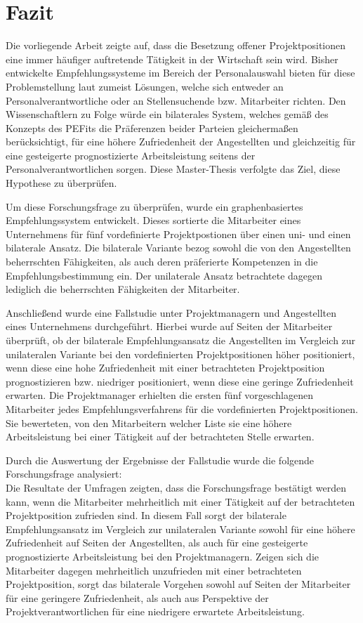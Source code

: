 \chapter{Fazit}
\label{ch:fazit}
Die vorliegende Arbeit zeigte auf, dass die Besetzung offener Projektpositionen eine immer häufiger auftretende Tätigkeit in der Wirtschaft sein wird. Bisher entwickelte Empfehlungssysteme im Bereich der Personalauswahl bieten für diese Problemstellung laut \textcite[S. 1ff.]{malinowski:2006} zumeist Lösungen, welche sich entweder an Personalverantwortliche oder an Stellensuchende bzw. Mitarbeiter richten. Den Wissenschaftlern zu Folge würde ein bilaterales System, welches gemäß des Konzepts des \acfp{PEFit} die Präferenzen beider Parteien gleichermaßen berücksichtigt, für eine höhere Zufriedenheit der Angestellten und gleichzeitig für eine gesteigerte prognostizierte Arbeitsleistung seitens der Personalverantwortlichen sorgen. Diese Master-Thesis verfolgte das Ziel, diese Hypothese zu überprüfen.

Um diese Forschungsfrage zu überprüfen, wurde ein graphenbasiertes Empfehlungssystem entwickelt. Dieses sortierte die Mitarbeiter eines Unternehmens für fünf vordefinierte Projektpostionen über einen uni- und einen bilaterale Ansatz. Die bilaterale Variante bezog sowohl die von den Angestellten beherrschten Fähigkeiten, als auch deren präferierte Kompetenzen in die Empfehlungsbestimmung ein. Der unilaterale Ansatz betrachtete dagegen lediglich die beherrschten Fähigkeiten der Mitarbeiter.

Anschließend wurde eine Fallstudie unter Projektmanagern und Angestellten eines Unternehmens durchgeführt. Hierbei wurde auf Seiten der Mitarbeiter überprüft, ob der bilaterale Empfehlungsansatz die Angestellten im Vergleich zur unilateralen Variante bei den vordefinierten Projektpositionen höher positioniert, wenn diese eine hohe Zufriedenheit mit einer betrachteten Projektposition prognostizieren bzw. niedriger positioniert, wenn diese eine geringe Zufriedenheit erwarten. Die Projektmanager erhielten die ersten fünf vorgeschlagenen Mitarbeiter jedes Empfehlungsverfahrens für die vordefinierten Projektpositionen. Sie bewerteten, von den Mitarbeitern welcher Liste sie eine höhere Arbeitsleistung bei einer Tätigkeit auf der betrachteten Stelle erwarten.

Durch die Auswertung der Ergebnisse der Fallstudie wurde die folgende Forschungsfrage analysiert: \forschungsfrage\\
Die Resultate der Umfragen zeigten, dass die Forschungsfrage bestätigt werden kann, wenn die Mitarbeiter mehrheitlich mit einer Tätigkeit auf der betrachteten Projektposition zufrieden sind. In diesem Fall sorgt der bilaterale Empfehlungsansatz im Vergleich zur unilateralen Variante sowohl für eine höhere Zufriedenheit auf Seiten der Angestellten, als auch für eine gesteigerte prognostizierte Arbeitsleistung bei den Projektmanagern. Zeigen sich die Mitarbeiter dagegen mehrheitlich unzufrieden mit einer betrachteten Projektposition, sorgt das bilaterale Vorgehen sowohl auf Seiten der Mitarbeiter für eine geringere Zufriedenheit, als auch aus Perspektive der Projektverantwortlichen für eine niedrigere erwartete Arbeitsleistung.

